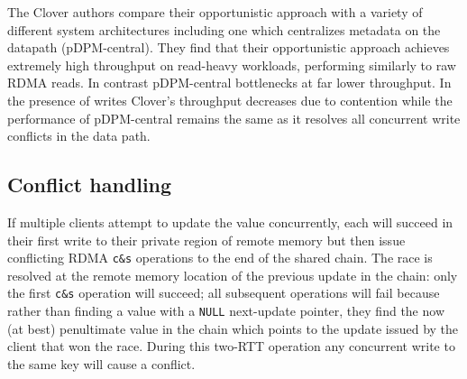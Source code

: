 
The Clover authors compare their opportunistic approach with a variety
of different system architectures including one which centralizes
metadata on the datapath (pDPM-central). They find that their
opportunistic approach achieves extremely high throughput on
read-heavy workloads, performing similarly to raw RDMA reads.  In
contrast pDPM-central bottlenecks at far lower throughput.  In the
presence of writes Clover's throughput decreases due to contention
while the performance of pDPM-central remains the same as it resolves all
concurrent write conflicts in the data path.



\subsection{Conflict handling}

If multiple clients attempt to update the value concurrently, each will
succeed in their first write to their private region of remote memory but
then issue conflicting RDMA \texttt{c\&s} operations to the end of the shared chain.
The race is resolved at the remote memory location of the previous update in
the chain: only the first \texttt{c\&s} operation will succeed; all subsequent
operations will fail because rather than finding a value with a \texttt{NULL}
next-update pointer, they find the now (at best) penultimate value in the
chain which points to the update issued by the client that won the race.
During this two-RTT operation any concurrent write to the same key will cause
a conflict.



